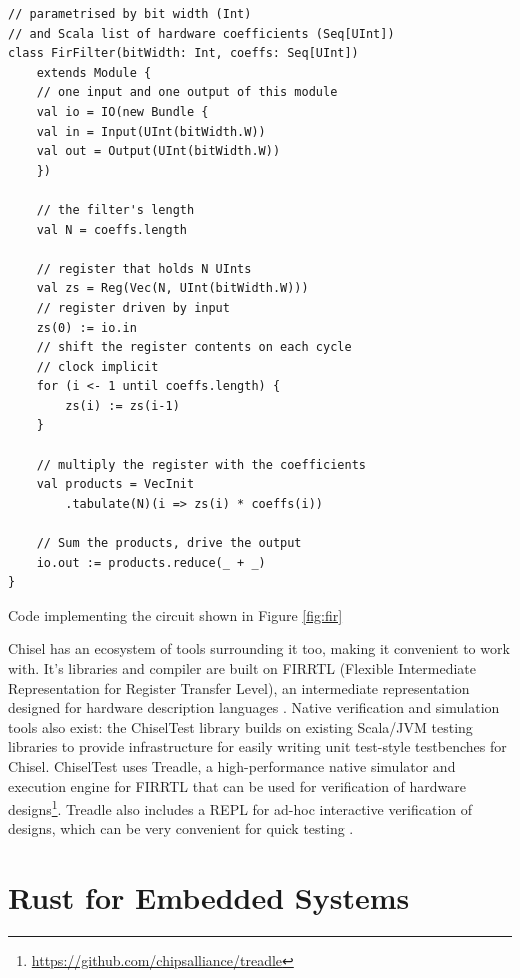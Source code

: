 \begin{listing}[H]
    \vspace{0.5cm}
    \begin{verbatim}
// parametrised by bit width (Int)
// and Scala list of hardware coefficients (Seq[UInt])
class FirFilter(bitWidth: Int, coeffs: Seq[UInt]) 
    extends Module {
    // one input and one output of this module
    val io = IO(new Bundle {
    val in = Input(UInt(bitWidth.W))
    val out = Output(UInt(bitWidth.W))
    })
    
    // the filter's length
    val N = coeffs.length

    // register that holds N UInts
    val zs = Reg(Vec(N, UInt(bitWidth.W)))
    // register driven by input
    zs(0) := io.in 
    // shift the register contents on each cycle 
    // clock implicit
    for (i <- 1 until coeffs.length) {
        zs(i) := zs(i-1)
    }

    // multiply the register with the coefficients
    val products = VecInit
        .tabulate(N)(i => zs(i) * coeffs(i))

    // Sum the products, drive the output
    io.out := products.reduce(_ + _)
}
    \end{verbatim}
    \caption{Code implementing the circuit shown in Figure \ref{fig:fir} \cite{chisel_site}}
    \label{lst:chisel_fir}
\end{listing}

Chisel has an ecosystem of tools surrounding it too, making it convenient to work with. It's libraries and compiler are built on FIRRTL (Flexible Intermediate Representation for Register Transfer Level), an intermediate representation designed for hardware description languages \cite{firrtl}. Native verification and simulation tools also exist: the ChiselTest library builds on existing Scala/JVM testing libraries to provide infrastructure for easily writing unit test-style testbenches for Chisel. ChiselTest uses Treadle, a high-performance native simulator and execution engine for FIRRTL that can be used for verification of hardware designs\footnote{\url{https://github.com/chipsalliance/treadle}}. Treadle also includes a REPL for ad-hoc interactive verification of designs, which can be very convenient for quick testing \cite{chisel_site}.

\section{Rust for Embedded Systems}

